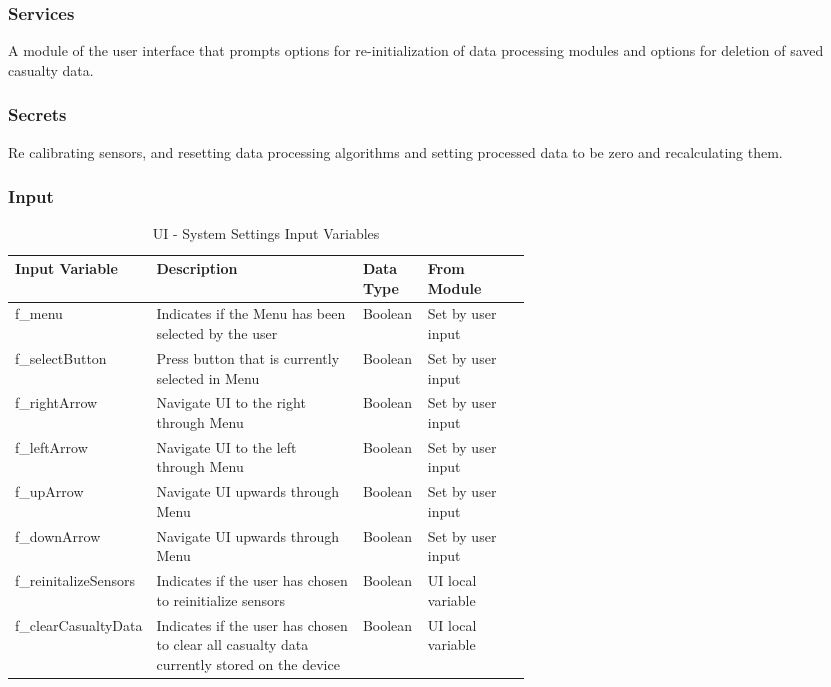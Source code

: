 \documentclass{article}
\begin{document}
\begin{description}
        \subsubsection{Services}
        A module of the user interface that prompts options for re-initialization of data processing modules and options for deletion of saved casualty data.
        \subsubsection{Secrets}
        Re calibrating sensors, and resetting data processing algorithms and setting processed data to be zero and recalculating them.
        \subsubsection{Input}
            \begin{longtable}{|l|p{0.4\linewidth}|l|p{0.2\linewidth}|}
            \caption{UI - System Settings Input Variables}
            \hline
            \textbf{Input Variable} & \textbf{Description} & \textbf {Data Type} & \textbf{From Module} \\
            \endhead
            \hline
            f\_menu   & Indicates if the Menu has been selected by the user & Boolean & Set by user input \\
            \hline
            f\_selectButton   & Press button that is currently selected in Menu & Boolean & Set by user input \\
            \hline
            f\_rightArrow   & Navigate UI to the right through Menu & Boolean & Set by user input \\
            \hline
            f\_leftArrow   & Navigate UI to the left through Menu & Boolean & Set by user input\\
            \hline
            f\_upArrow   & Navigate UI upwards through Menu & Boolean & Set by user input\\
            \hline
            f\_downArrow  & Navigate UI upwards through Menu & Boolean & Set by user input\\
            \hline
            f\_reinitalizeSensors   & Indicates if the user has chosen to reinitialize sensors & Boolean & UI local variable \\
            \hline
            f\_clearCasualtyData   & Indicates if the user has chosen to clear all casualty data currently stored on the device & Boolean & UI local variable \\
            \hline
            \end{longtable}

\end{description}
\end{document}
